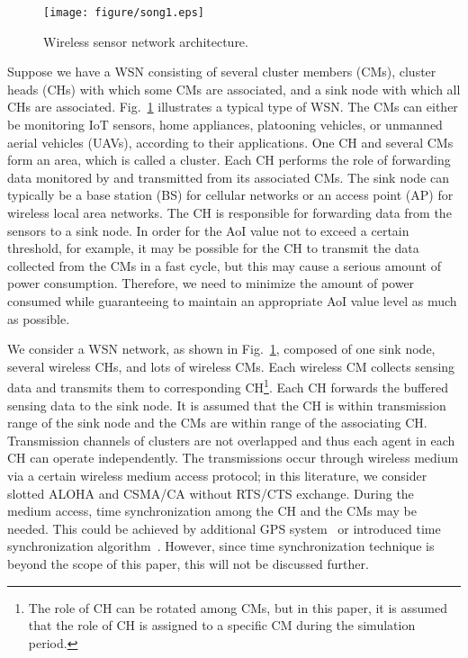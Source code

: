 \documentclass[journal]{IEEEtran}
\begin{document}
\begin{figure}
\centering
\texttt{[image: figure/song1.eps]}
\caption{Wireless sensor network architecture.}
\label{fig:wsn}
\end{figure}
Suppose we have a WSN consisting of several cluster members (CMs), cluster heads (CHs) with which some CMs are associated, and a sink node with which all CHs are associated. Fig.~\ref{fig:wsn} illustrates a typical type of WSN. The CMs can either be monitoring IoT sensors, home appliances, platooning vehicles, or unmanned aerial vehicles (UAVs), according to their applications. One CH and several CMs form an area, which is called a cluster. Each CH performs the role of forwarding data monitored by and transmitted from its associated CMs. The sink node can typically be a base station (BS) for cellular networks or an access point (AP) for wireless local area networks. The CH is responsible for forwarding data from the sensors to a sink node. In order for the AoI value not to exceed a certain threshold, for example, it may be possible for the CH to transmit the data collected from the CMs in a fast cycle, but this may cause a serious amount of power consumption. Therefore, we need to minimize the amount of power consumed while guaranteeing to maintain an appropriate AoI value level as much as possible.

We consider a WSN network, as shown in Fig.~\ref{fig:wsn}, composed of one sink node, several wireless CHs, and lots of wireless CMs. Each wireless CM collects sensing data and transmits them to corresponding CH\footnote{The role of CH can be rotated among CMs, but in this paper, it is assumed that the role of CH is assigned to a specific CM during the simulation period.}. Each CH forwards the buffered sensing data to the sink node. 
It is assumed that the CH is within transmission range of the sink node and the CMs are within range of the associating CH.
Transmission channels of clusters are not overlapped and thus each agent in each CH can operate independently. The transmissions occur through wireless medium via a certain wireless medium access protocol; in this literature, we consider slotted ALOHA and CSMA/CA without RTS/CTS exchange. 
During the medium access, time synchronization among the CH and the CMs may be needed. This could be achieved by additional GPS system~\cite{baek2013beacon} or introduced time synchronization algorithm~\cite{polonelli2019slotted}. However, since time synchronization technique is beyond the scope of this paper, this will not be discussed further.
\end{document}
